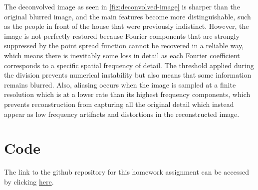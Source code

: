 \documentclass[a4paper,11pt]{article}
\begin{document}
The deconvolved image as seen in \cref{fig:deconvolved-image} is sharper than the original blurred image, and the main features become more distinguishable, such as the people in front of the house that were previously indistinct. However, the image is not perfectly restored because Fourier components that are strongly suppressed by the point spread function cannot be recovered in a reliable way, which means there is inevitably some loss in detail as each Fourier coefficient corresponds to a specific spatial frequency of detail. The threshold applied during the division prevents numerical instability but also means that some information remains blurred. Also, aliasing occurs when the image is sampled at a finite resolution which is at a lower rate than its highest frequency components, which prevents reconstruction from capturing all the original detail which instead appear as low frequency artifacts and distortions in the reconstructed image.

\section*{Code}

The link to the github repository for this homework assignment can be accessed by clicking \href{https://github.com/jpalmagomez/computational_physics_homework.git}{here}.

\clearpage
\end{document}
